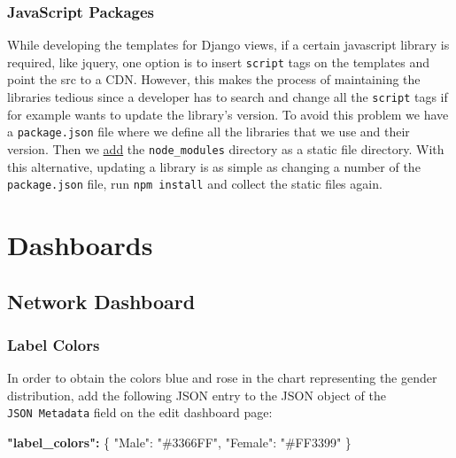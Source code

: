 \documentclass[
]{book}
\newenvironment{Shaded}{\begin{snugshade}}{\end{snugshade}}
\newcommand{\DataTypeTok}[1]{\textcolor[rgb]{0.13,0.29,0.53}{#1}}
\newcommand{\ErrorTok}[1]{\textcolor[rgb]{0.64,0.00,0.00}{\textbf{#1}}}
\newcommand{\FunctionTok}[1]{\textcolor[rgb]{0.00,0.00,0.00}{#1}}
\newcommand{\StringTok}[1]{\textcolor[rgb]{0.31,0.60,0.02}{#1}}
\begin{document}
\hypertarget{javascript-packages}{%
\subsection*{JavaScript Packages}\label{javascript-packages}}

While developing the templates for Django views, if a certain javascript library is required, like jquery, one option is to insert \texttt{script} tags on the templates and point the src to a CDN.
However, this makes the process of maintaining the libraries tedious since a developer has to search and change all the \texttt{script} tags if for example wants to update the library's version.
To avoid this problem we have a \texttt{package.json} file where we define all the libraries that we use and their version.
Then we \href{https://github.com/EHDEN/NetworkDashboards/blob/master/dashboard_viewer/dashboard_viewer/settings.py\#L182}{add} the \texttt{node\_modules} directory as a static file directory.
With this alternative, updating a library is as simple as changing a number of the \texttt{package.json} file, run \texttt{npm\ install} and collect the static files again.

\hypertarget{dashboards}{%
\chapter{Dashboards}\label{dashboards}}

\hypertarget{PerDatabaseDashboard}{%
\section{Network Dashboard}\label{PerDatabaseDashboard}}

\hypertarget{label-colors}{%
\subsection*{Label Colors}\label{label-colors}}

In order to obtain the colors blue and rose in the chart representing the gender distribution,
add the following JSON entry to the JSON object of the \texttt{JSON\ Metadata} field on the edit dashboard page:

\begin{Shaded}
\begin{Highlighting}[]
\ErrorTok{"label\_colors":} \FunctionTok{\{}
    \DataTypeTok{"Male"}\FunctionTok{:} \StringTok{"\#3366FF"}\FunctionTok{,} 
    \DataTypeTok{"Female"}\FunctionTok{:} \StringTok{"\#FF3399"}
\FunctionTok{\}}
\end{Highlighting}
\end{Shaded}
\end{document}
